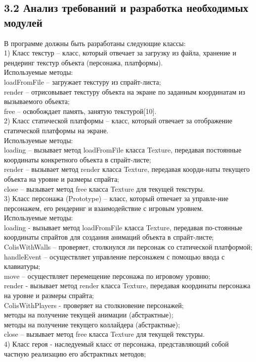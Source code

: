 \documentclass[14pt,a4paper]{extreport}
\begin{document}
	\subsection*{\normalsize\hspace{4ex}3.2 Анализ требований и разработка необходимых модулей}
	\hspace{4ex}В программе должны быть разработаны следующие классы:
\\1)	Класс текстур  – класс, который отвечает за загрузку из файла, хранение и рендеринг текстур объекта (персонажа, платформы).
\\Используемые методы:
\\loadFromFile – загружает текстуру из спрайт-листа;
\\ render – отрисовывает текстуру объекта на экране по заданным координатам из вызываемого объекта;
\\free – освобождает память, занятую текстурой[10].
\\2)	Класс статической платформы – класс, который отвечает за отображение статической платформы на экране.
\\Используемые методы:
\\loading – вызывает метод loadFromFile класса Texture, передавая постоянные координаты конкретного объекта в спрайт-листе;
\\render – вызывает метод render класса Texture, передавая коорди-наты текущего объекта на уровне и размеры спрайта;
\\close – вызывает метод free класса Texture для текущей текстуры.
\\3)	Класс персонажа (Prototype) – класс, который отвечает за управле-ние персонажем, его рендеринг и взаимодействие с игровым уровнем.
\\Используемые методы:
\\loading - вызывает метод loadFromFile класса Texture, передавая по-стоянные координаты спрайтов для создания анимаций объекта в спрайт-листе;
\\ColisWithWalls – проверяет, столкнулся ли персонаж со статической платформой;
\\handleEvent – осуществляет управление персонажем с помощью ввода с клавиатуры;
\\move – осуществляет перемещение персонажа по игровому уровню;
\\render -  вызывает метод render класса Texture, передавая координаты персонажа на уровне и размеры спрайта;
\\ColisWithPlayers - проверяет на столкновение персонажей;
\\методы на получение текущей анимации (абстрактные);
\\методы на получение текущего коллайдера (абстрактные);
\\close – вызывает метод free класса Texture для текущей текстуры.
\\4)	Класс героя - наследуемый класс от персонажа, представляющий собой частную реализацию его абстрактных методов;
\end{document}
